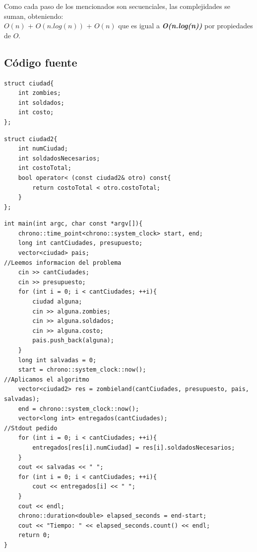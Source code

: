 Como cada paso de los mencionados son secuenciales, las complejidades se suman, obteniendo:\\

$O(n)$ + $O(n.log(n))$ + $O(n)$ 
 que es igual a \textit{\textbf{O(n.log(n))}} por propiedades de $O$.


\newpage

\subsection{C\'odigo fuente}

	\begin{codesnippet}
	\begin{verbatim}
struct ciudad{
    int zombies;
    int soldados;
    int costo;
};
	\end{verbatim}
	\end{codesnippet}

	\begin{codesnippet}
	\begin{verbatim}
struct ciudad2{
    int numCiudad;
    int soldadosNecesarios;
    int costoTotal;
    bool operator< (const ciudad2& otro) const{
        return costoTotal < otro.costoTotal;
    }
};
	\end{verbatim}
	\end{codesnippet}


	\begin{codesnippet}
	\begin{verbatim}
int main(int argc, char const *argv[]){
    chrono::time_point<chrono::system_clock> start, end;
    long int cantCiudades, presupuesto;
    vector<ciudad> pais;
//Leemos informacion del problema
    cin >> cantCiudades;
    cin >> presupuesto;
    for (int i = 0; i < cantCiudades; ++i){
        ciudad alguna;
        cin >> alguna.zombies;
        cin >> alguna.soldados;
        cin >> alguna.costo;
        pais.push_back(alguna);
    }
    long int salvadas = 0;
    start = chrono::system_clock::now();
//Aplicamos el algoritmo
    vector<ciudad2> res = zombieland(cantCiudades, presupuesto, pais, salvadas);
    end = chrono::system_clock::now();
    vector<long int> entregados(cantCiudades);
//Stdout pedido
    for (int i = 0; i < cantCiudades; ++i){
        entregados[res[i].numCiudad] = res[i].soldadosNecesarios;
    }
    cout << salvadas << " ";
    for (int i = 0; i < cantCiudades; ++i){
        cout << entregados[i] << " ";
    }
    cout << endl;
    chrono::duration<double> elapsed_seconds = end-start;
    cout << "Tiempo: " << elapsed_seconds.count() << endl;
    return 0;
}
	\end{verbatim}
	\end{codesnippet}
	
